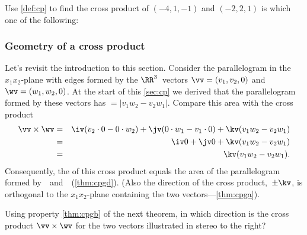\begin{activity} 
Use \cref{def:cp} to find the cross product of \((-4,1,-1)\) and \((-2,2,1)\) is which one of the following:
\end{activity}




\subsubsection{Geometry of a cross product}


\begin{example} \label{eg:cppara}
Let's revisit the introduction to this section.
Consider the parallelogram in the \(x_1x_2\)-plane with edges formed by the \(\RR^3\)~vectors \(\vv=(v_1,v_2,0)\) and \(\wv=(w_1,w_2,0)\).
At the start of this \cref{sec:cp} we derived that the parallelogram formed by these vectors has \({}=|v_1w_2-v_2w_1|\).
Compare this area with the cross product
\begin{eqnarray*}
\vv\times\wv&=&\iv(v_2\cdot0-0\cdot w_2)
+\jv(0\cdot w_1-v_1\cdot0)
+\kv(v_1w_2-v_2w_1)
\\&=&\iv0+\jv0+\kv(v_1w_2-v_2w_1)
\\&=&\kv(v_1w_2-v_2w_1).
\end{eqnarray*}
Consequently, the  of this cross product equals the area of the parallelogram formed by~\vv\ and~\wv\ (\cref{thm:cpgd}).
(Also the direction of the cross product,~\(\pm\kv\), is orthogonal to the \(x_1x_2\)-plane containing the two vectors---\cref{thm:cpga}).
\end{example}


\begingroup
\def\temp{\qview{30}{35}{\begin{tikzpicture} 
\begin{axis}[footnotesize,font=\footnotesize,axis equal,view={\q}{30}
    ,xlabel={$x_1$},ylabel={$x_2$},zlabel={$x_3$},label shift={-1.5ex}
    ]
    \threev[above]20{0.5}{\vec v};
    \threev[above]102{\vec w};
\end{axis}
\end{tikzpicture}}}
\begin{activity}[\temp]
Using property \ref{thm:cpgb} of the next theorem, in which direction is the cross product \(\vv\times\wv\) for the two vectors illustrated in stereo to the right?
\actposs{\(-\jv\)}{\(+\iv\)}{\(+\jv\)}{\(-\iv\)}
\end{activity}
\endgroup



